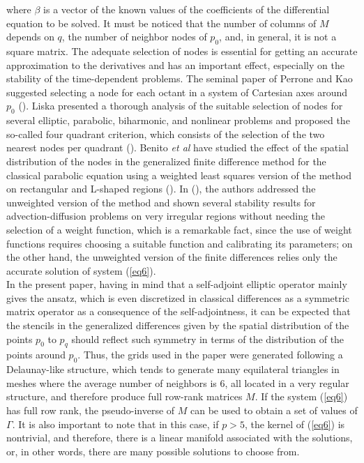 \documentclass[a4paper,fleqn]{cas-sc}
\begin{document}
where $\beta$ is a vector of the known values of the coefficients of the differential equation to be solved. It must be noticed that the number of columns of $M$ depends on $q$, the number of neighbor nodes of $p_0$, and, in general, it is not a square matrix.
{
The adequate selection of nodes is essential for getting an accurate approximation to the derivatives and has an important effect, especially on the stability of the time-dependent problems. The seminal paper of Perrone and Kao suggested selecting a node for each octant in a system of Cartesian axes around $p_0$ (\cite{perrone1975general}). Liska presented a thorough analysis of the suitable selection of nodes for several elliptic, parabolic, biharmonic, and nonlinear problems and proposed the so-called four quadrant criterion, which consists of the selection of the two nearest nodes per quadrant (\cite{liszka1980finite}). Benito {\em et al} have studied the effect of the spatial distribution of the nodes in the generalized finite difference method for the classical parabolic equation using a weighted least squares version of the method on rectangular and L-shaped regions (\cite{benito2001influence}). In (\cite{tinoco2018stability,tinoco2020study,roman2022numerical}), the authors addressed the unweighted version of the method and shown several stability results for advection-diffusion problems on very irregular regions without needing the selection of a weight function, which is a remarkable fact, since the use of weight functions requires choosing a suitable function and calibrating its parameters; on the other hand, the unweighted version of the finite differences relies only the accurate solution of system (\ref{eq6}).\\
In the present paper, having in mind that a self-adjoint elliptic operator mainly gives the ansatz, which is even discretized in classical differences as a symmetric matrix operator as a consequence of the self-adjointness, it can be expected that the stencils in the generalized differences given by the spatial distribution of the points $p_0$ to $p_q$ should reflect such symmetry in terms of the distribution of the points around $p_0$. Thus, the grids used in the paper were generated following a Delaunay-like structure, which tends to generate many equilateral triangles in meshes where the average number of neighbors is 6, all located in a very regular structure, and therefore produce full row-rank matrices $M$.
}
If the system (\ref{eq6}) has full row rank, the pseudo-inverse of $M$ can be used to obtain a set of values of $\Gamma$. It is also important to note that in this case, if $p>5$, the kernel of (\ref{eq6}) is nontrivial, and therefore, there is a linear manifold associated with the solutions, or, in other words, there are many possible solutions to choose from.
\end{document}
